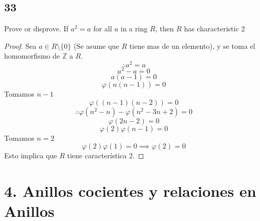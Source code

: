 \documentclass[11pt]{article}
\newcommand{\set}[1]{\mathbb{#1}}
\theoremstyle{definition}
\begin{document}
        \subsection{33}
        Prove or disprove. If $a^2=a$ for all $a$ in a ring $R$, then $R$ has characteristic 2
        \begin{proof}
            Sea $a\in R\setminus\{0\}$ (Se asume que $R$ tiene mas de un elemento), y se toma el homomorfismo de $\set{Z}$ a $R$.
            \[\therefore a^2=a\]
            \[a^2-a=0\]
            \[a(a-1)=0\]
            \[\varphi(n(n-1))=0\]
            Tomamos $n-1$
            \[\varphi((n-1)(n-2))=0\]
            \[\therefore \varphi(n^2-n)-\varphi(n^2-3n+2)=0\]
            \[\varphi(2n-2)=0\]
            \[\varphi(2)\varphi(n-1)=0\]
            Tomamos $n=2$
            \[\varphi(2)\varphi(1)=0\implies\varphi(2)=0\]
            Esto implica que $R$ tiene característica 2.
        \end{proof}

        \section{4. Anillos cocientes y relaciones en Anillos}
\end{document}
